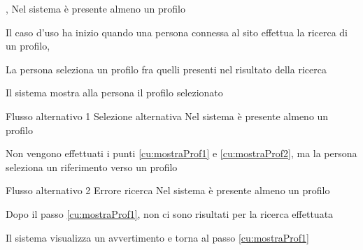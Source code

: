 \tabcuvspace

%

{, }
{Nel sistema è presente almeno un profilo}
{\postNulle}
{\begin{enumCU}
	\item Il caso d'uso ha inizio quando una persona connessa al sito effettua la ricerca di un profilo, \label{cu:mostraProf1}
	\item La persona seleziona un profilo fra quelli presenti nel risultato della ricerca\label{cu:mostraProf2}
	\item Il sistema mostra alla persona il profilo selezionato
\end{enumCU}}
%
{Flusso alternativo 1}%
{Selezione alternativa}%
{Nel sistema è presente almeno un profilo}%
{\postNulle}%
{\begin{enumCU}
		\item Non vengono effettuati i punti \ref{cu:mostraProf1} e \ref{cu:mostraProf2}, ma la persona seleziona un \gls{riferimento} verso un profilo
\end{enumCU}}%
%
{Flusso alternativo 2}%
{Errore ricerca}%
{Nel sistema è presente almeno un profilo}%
{\postNulle}%
{\begin{enumCU}
		\item Dopo il passo \ref{cu:mostraProf1}, non ci sono risultati per la ricerca effettuata
		\item Il sistema visualizza un avvertimento e torna al passo \ref{cu:mostraProf1}
\end{enumCU}}%
%
%


